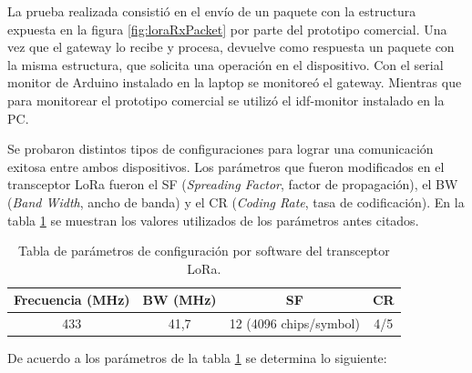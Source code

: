 La prueba realizada consistió en el envío de un paquete con la estructura expuesta en la figura \ref{fig:loraRxPacket} por parte del prototipo comercial. Una vez que el gateway lo recibe y procesa, devuelve como respuesta un paquete con la misma estructura, que solicita una operación en el dispositivo. Con el serial monitor de Arduino instalado en la laptop se monitoreó el gateway. Mientras que para monitorear el prototipo comercial se utilizó el idf-monitor instalado en la PC. 
%
%

Se probaron distintos tipos de configuraciones para lograr una comunicación exitosa entre ambos dispositivos. Los parámetros que fueron modificados en el transceptor LoRa fueron el SF (\textit{Spreading Factor}, factor de propagación), el BW (\textit{Band Width}, ancho de banda) y el CR (\textit{Coding Rate}, tasa de codificación). En la tabla \ref{tab:testLoraTable} se muestran los valores utilizados de los parámetros antes citados.

\begin{table}[h]
	\centering
	\caption[Parámetros del transceptor LoRa]{Tabla de parámetros de configuración por software del transceptor LoRa.}
	\begin{tabular}{c c c c}    
		\toprule
		\textbf{Frecuencia (MHz)} & \textbf{BW (MHz)} & \textbf{SF} & \textbf{CR}  \\
		\midrule
		433 & 41,7 & 12 (4096 chips/symbol) & 4/5 \\		
		\bottomrule
		\hline
	\end{tabular}
	\label{tab:testLoraTable}
\end{table}

De acuerdo a los parámetros de la tabla \ref{tab:testLoraTable} se determina lo siguiente:

